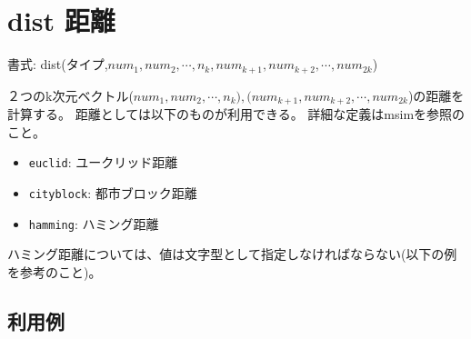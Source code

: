 
%

\section{dist 距離\label{sect:dist}}

書式: dist(タイプ,$num_1,num_2,\cdots,n_k,num_{k+1},num_{k+2},\cdots,num_{2k}$)

２つのk次元ベクトル($num_1,num_2,\cdots,n_k),(num_{k+1},num_{k+2},\cdots,num_{2k}$)の距離を計算する。
距離としては以下のものが利用できる。
詳細な定義はmsimを参照のこと。

\begin{itemize}
\item \verb|euclid|: ユークリッド距離
\item \verb|cityblock|: 都市ブロック距離
\item \verb|hamming|: ハミング距離
\end{itemize}

ハミング距離については、値は文字型として指定しなければならない(以下の例を参考のこと)。

\subsection*{利用例}


%


